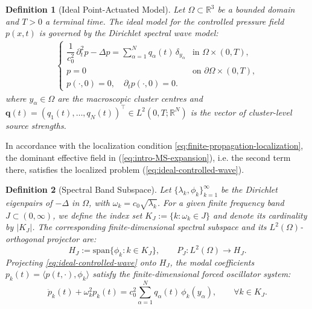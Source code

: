 \documentclass[11pt,a4paper]{article}
\numberwithin{equation}{section}
\newtheorem{definition}{Definition}
\begin{document}

\begin{definition}[Ideal Point-Actuated Model]
Let $\Omega \subset \mathbb{R}^3$ be a bounded domain and $T > 0$ a terminal time. The \emph{ideal model} for the controlled pressure field $p(x,t)$ is governed by the Dirichlet spectral wave model:
\begin{align}\label{eq:ideal-controlled-wave}
    \begin{cases}
        \dfrac{1}{c_0^2}\,\partial_t^2 p - \Delta p = \displaystyle\sum_{\alpha=1}^N q_\alpha(t)\,\delta_{y_\alpha}
        & \text{in }\Omega\times(0,T),\\
        p = 0 & \text{on }\partial\Omega\times(0,T),\\
        p(\cdot,0)=0,\quad \partial_t p(\cdot,0)=0.
    \end{cases}
\end{align}
where $y_\alpha \in \Omega$ are the macroscopic cluster centres and $\mathbf q(t)=(q_1(t),\ldots,q_N(t))^\top\in L^2(0,T;\mathbb R^N)$ is the vector of cluster-level source strengths.
\end{definition}


\noindent 
In accordance with the localization condition \eqref{eq:finite-propagation-localization}, the dominant effective field in (\ref{eq:intro-MS-expansion}), i.e. the second term there, satisfies the localized problem (\ref{eq:ideal-controlled-wave}). 

\begin{definition}[Spectral Band Subspace]
Let $\{\lambda_k, \phi_k\}_{k=1}^\infty$ be the Dirichlet eigenpairs of $-\Delta$ in $\Omega$, with $\omega_k=c_0\sqrt{\lambda_k}$. For a given finite frequency band $J\subset(0,\infty)$, we define the index set $K_J := \{k : \omega_k \in J\}$ and denote its cardinality by $|K_J|$. The corresponding finite-dimensional spectral subspace and its $L^2(\Omega)$-orthogonal projector are:
\begin{equation}
 H_J := \mathrm{span}\{\phi_k : k \in K_J\}, \qquad P_J : L^2(\Omega) \to H_J.
\end{equation}
Projecting \eqref{eq:ideal-controlled-wave} onto $H_J$, the modal coefficients $p_k(t) = \langle p(t, \cdot), \phi_k \rangle$ satisfy the finite-dimensional forced oscillator system:
\begin{equation}
\label{eq:modal-ode}
 \ddot p_k(t)+\omega_k^2 p_k(t)=c_0^2\sum_{\alpha=1}^N q_\alpha(t)\,\phi_k(y_\alpha),\qquad \forall k\in K_J.
\end{equation}
\end{definition}
\end{document}
